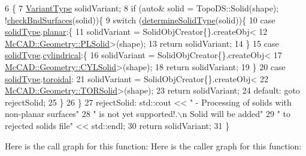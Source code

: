 \begin{DoxyCode}
6                                                                 \{
7     \hyperlink{classMcCAD_1_1Decomposition_1_1Preprocessor_a55fe8b69008632be9a000e551c3dfe90}{VariantType} solidVariant;
8     \textcolor{keywordflow}{if} (\textcolor{keyword}{auto}& solid = TopoDS::Solid(shape); !\hyperlink{classMcCAD_1_1Decomposition_1_1Preprocessor_a1a473424ccfb217e9bce1730e1f8a0da}{checkBndSurfaces}(solid))\{
9         \textcolor{keywordflow}{switch} (\hyperlink{classMcCAD_1_1Decomposition_1_1Preprocessor_a6cb10d69b1bfd3351a5211c255657d62}{determineSolidType}(solid))\{
10         \textcolor{keywordflow}{case} \hyperlink{classMcCAD_1_1Decomposition_1_1Preprocessor_a556f8a0b05725f3c17f828fb4c23e9a9}{solidType}.\hyperlink{classMcCAD_1_1Tools_1_1SolidType_a69c62abbe9fa709ccbaf47d4daf356e1a03cc49496c89d07ea5f8ef75c4912243}{planar}:\{
11             solidVariant = SolidObjCreator\{\}.createObj<
12                     \hyperlink{classMcCAD_1_1Geometry_1_1PLSolid}{McCAD::Geometry::PLSolid}>(shape);
13             \textcolor{keywordflow}{return} solidVariant;
14         \}
15         \textcolor{keywordflow}{case} \hyperlink{classMcCAD_1_1Decomposition_1_1Preprocessor_a556f8a0b05725f3c17f828fb4c23e9a9}{solidType}.\hyperlink{classMcCAD_1_1Tools_1_1SolidType_a69c62abbe9fa709ccbaf47d4daf356e1aed38f6feaeb26f0baf2614a0d421b638}{cylindrical}:\{
16             solidVariant = SolidObjCreator\{\}.createObj<
17                     \hyperlink{classMcCAD_1_1Geometry_1_1CYLSolid}{McCAD::Geometry::CYLSolid}>(shape);
18             \textcolor{keywordflow}{return} solidVariant;
19         \}
20         \textcolor{keywordflow}{case} \hyperlink{classMcCAD_1_1Decomposition_1_1Preprocessor_a556f8a0b05725f3c17f828fb4c23e9a9}{solidType}.\hyperlink{classMcCAD_1_1Tools_1_1SolidType_a69c62abbe9fa709ccbaf47d4daf356e1ad9493def4181ec95fec305f92c8ba5f0}{toroidal}:
21             solidVariant = SolidObjCreator\{\}.createObj<
22                     \hyperlink{classMcCAD_1_1Geometry_1_1TORSolid}{McCAD::Geometry::TORSolid}>(shape);
23             \textcolor{keywordflow}{return} solidVariant;
24         \textcolor{keywordflow}{default}: \textcolor{keywordflow}{goto} rejectSolid;
25         \}
26     \}
27     rejectSolid: std::cout << \textcolor{stringliteral}{"   - Processing of solids with non-planar surfaces"}
28                               \textcolor{stringliteral}{" is not yet supported!.\(\backslash\)n     Solid will be added"}
29                               \textcolor{stringliteral}{" to rejected solids file"} << std::endl;
30     \textcolor{keywordflow}{return} solidVariant;
31 \}
\end{DoxyCode}
Here is the call graph for this function\+:
Here is the caller graph for this function\+:


